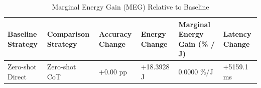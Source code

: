 \begin{table}
\caption{Marginal Energy Gain (MEG) Relative to Baseline}
\label{tab:marginal_energy_gain}
\begin{tabular}{llllll}
\toprule
Baseline Strategy & Comparison Strategy & Accuracy Change & Energy Change & Marginal Energy Gain (\% / J) & Latency Change \\
\midrule
Zero-shot Direct & Zero-shot CoT & +0.00 pp & +18.3928 J & 0.0000 \%/J & +5159.1 ms \\
\bottomrule
\end{tabular}
\end{table}
